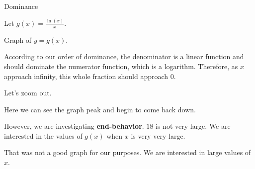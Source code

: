 \documentclass{ximera}
\begin{document}
\begin{example} Dominance


Let $g(x) = \frac{\ln(x)}{x}$.

Graph of $y = g(x)$.


According to our order of dominance, the denominator is a linear function and should dominate the numerator function, which is a logarithm.  Therefore, as $x$ approach infinity, this whole fraction should approach $0$.


\begin{image}
\end{image}



Let's zoom out.


\begin{center}
\end{center}



Here we can see the graph peak and begin to come back down.   


However, we are investigating \textbf{end-behavior}.  $18$ is not very large. We are interested in the values of $g(x)$ when $x$ is very very large.  

That was not a good graph for our purposes.  We are interested in large values of $x$.










\end{example}
\end{document}
